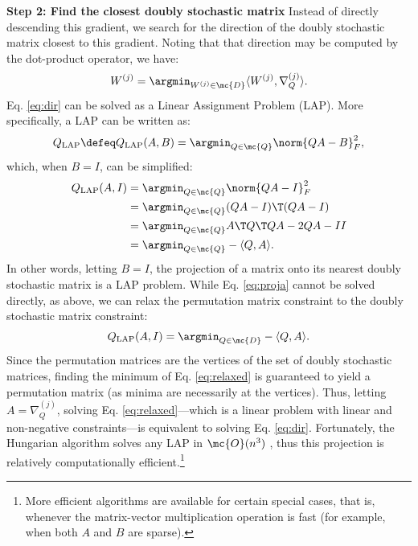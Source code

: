 \documentclass[10pt,journal,cspaper,compsoc]{IEEEtran}
\begin{document}
\textbf{Step 2: Find the closest doubly stochastic matrix} Instead of directly descending this gradient, we search for the direction of the doubly stochastic matrix closest to this gradient. Noting that that direction may be computed by the dot-product operator, we have:
\begin{align}\label{eq:dir}
	W^{(j)} = \argmin_{W^{(j)} \in \mc{D}} \langle W^{(j)}, \nabla_Q^{(j)} \rangle. %
\end{align}
Eq. \eqref{eq:dir} can be solved as a Linear Assignment Problem (LAP).  More specifically, a LAP can be written as:
\begin{align} \label{eq:LAP}
	Q_{\text{LAP}} \defeq Q_{\text{LAP}}(A,B) = \argmin_{Q \in \mc{Q}} \norm{QA - B }^2_F,
\end{align}
which, when $B=I$, can be simplified:
\begin{align} \label{eq:proja}
	Q_{\text{LAP}}(A,I) &=\argmin_{Q \in \mc{Q}} \norm{QA - I}_F^2 
	\nonumber \\ &= \argmin_{Q \in \mc{Q}} (QA-I)\T (QA-I) 
	\nonumber\\ &=\argmin_{Q \in \mc{Q}} A\T Q\T QA -2QA - II 
	\nonumber\\ &= \argmin_{Q \in \mc{Q}}  -\langle Q, A \rangle.  
\end{align}
In other words, letting $B=I$, the projection of a matrix onto its nearest doubly stochastic matrix is a LAP problem.  While Eq. \eqref{eq:proja} cannot be solved directly, as above, we can relax the permutation matrix constraint to the doubly stochastic matrix constraint:
\begin{align}\label{eq:relaxed}
	Q_{\text{LAP}}(A,I) = \argmin_{Q\in\mc{D}} -\langle Q, A \rangle. 
\end{align}
Since the permutation matrices are the vertices of the set of doubly stochastic matrices, finding the minimum of Eq. \eqref{eq:relaxed} is guaranteed to yield a permutation matrix (as minima are necessarily at the vertices).  Thus, letting $A=\nabla_Q^{(j)}$, solving Eq. \eqref{eq:relaxed}---which is a linear problem with linear and non-negative constraints---is equivalent to solving Eq. \eqref{eq:dir}.  Fortunately, the Hungarian algorithm solves any LAP in $\mc{O}(n^3)$ \cite{Burkard2009}, thus this projection is relatively computationally efficient.\footnote{More efficient algorithms are available for certain special cases, that is, whenever the matrix-vector multiplication operation is fast (for example, when both $A$ and $B$ are sparse).}
\end{document}
